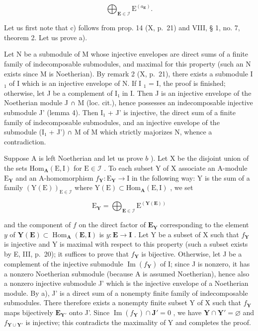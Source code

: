 \[
\bigoplus_ {\mathbf {E} \in \mathcal {I}} \mathrm{E} ^ {(a _ {\mathbf {E}})}.
\]

Let us first note that c) follows from prop. 14 (X, p.~21) and VIII, § 1, no. 7, theorem 2. Let us prove a).

Let N be a submodule of M whose injective envelopes are direct sums of a finite family of indecomposable submodules, and maximal for this property (such an N exists since M is Noetherian). By remark 2 (X, p.~21), there exists a submodule I \(_{1}\) of I which is an injective envelope of N. If I \(_{1}\) = I, the proof is finished; otherwise, let J be a complement of I₁ in I. Then J is an injective envelope of the Noetherian module J ∩ M (loc. cit.), hence possesses an indecomposable injective submodule J' (lemma 4). Then I₁ + J' is injective, the direct sum of a finite family of indecomposable submodules, and an injective envelope of the submodule (I₁ + J') ∩ M of M which strictly majorizes N, whence a contradiction.

Suppose A is left Noetherian and let us prove \(b\) ). Let X be the disjoint union of the sets \(\mathrm{Hom}_{\mathbf{A}}(\mathrm{E},\mathrm{I})\) for \(\mathrm{E}\in\mathcal{I}\) . To each subset Y of X associate an A-module \(\mathrm{E}_{\mathbf{Y}}\) and an A-homomorphism \(f_{\mathbf{Y}}:\mathrm{E}_{\mathbf{Y}}\to\mathrm{I}\) in the following way: Y is the sum of a family \((\mathrm{Y}(\mathrm{E}))_{\mathrm{E}\in\mathcal{I}}\) where \(\mathrm{Y}(\mathrm{E})\subset\mathrm{Hom}_{\mathbf{A}}(\mathrm{E},\mathrm{I})\) , we set

\[
\mathrm{E} _ {\mathbf {Y}} = \bigoplus_ {\mathbf {E} \in \mathcal {I}} \mathrm{E} ^ {(\mathbf {Y} (\mathbf {E}))}
\]

and the component of \(f\) on the direct factor of \(\mathbf{E}_{\mathbf{Y}}\) corresponding to the element \(y\) of \(\mathbf{Y}(\mathbf{E}) \subset \operatorname{Hom}_{\mathbf{A}}(\mathbf{E}, \mathbf{I})\) is \(y: \mathbf{E} \to \mathbf{I}\) . Let Y be a subset of X such that \(f_{\mathbf{Y}}\) is injective and Y is maximal with respect to this property (such a subset exists by E, III, p.~20); it suffices to prove that \(f_{\mathbf{Y}}\) is bijective. Otherwise, let J be a complement of the injective submodule \(\operatorname{Im}(f_{\mathbf{Y}})\) of I; since J is nonzero, it has a nonzero Noetherian submodule (because A is assumed Noetherian), hence also a nonzero injective submodule J' which is the injective envelope of a Noetherian module. By a), J' is a direct sum of a nonempty finite family of indecomposable submodules. There therefore exists a nonempty finite subset Y of X such that \(f_{\mathbf{Y}}\) maps bijectively \(\mathbf{E}_{\mathbf{Y}'}\) onto J'. Since \(\operatorname{Im}(f_{\mathbf{Y}}) \cap \mathbf{J}' = 0\) , we have \(\mathbf{Y} \cap \mathbf{Y}' = \varnothing\) and \(f_{\mathbf{Y} \cup \mathbf{Y}'}\) is injective; this contradicts the maximality of Y and completes the proof.

